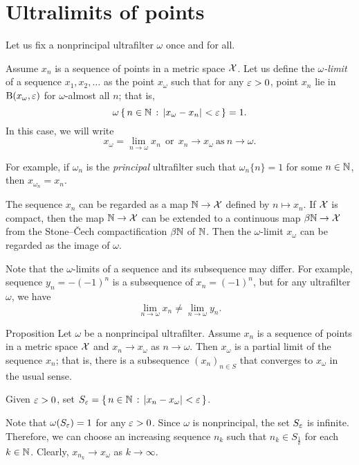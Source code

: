 \section{Ultralimits of points}
\label{ultralimits}

Let us fix a nonprincipal  ultrafilter $\omega$ once and for all.

Assume $x_n$ is a sequence of points in a metric space $\mathcal{X}$. 
Let us define the \emph{$\omega$-limit} of a sequence $x_1,x_2,\dots$ as the point $x_\omega$ 
such that for any $\varepsilon>0$, point $x_n$ lie in $\mathrm{B}{}(x_\omega,\varepsilon)$ for $\omega$-almost all $n$; 
that is,
\[\omega\set{n\in\NN}{\dist{x_\omega}{x_n}{}<\eps}=1.\]
In this case, we will write 
\[x_\omega=\lim_{n\to\omega} x_n
\ \ \text{or}\ \ 
x_n\to x_\omega\ \text{as}\ n\to\omega.\]

For example, if $\omega_n$ is the \textit{principal} ultrafilter such that $\omega_n\{n\}=1$ for some $n\in\mathbb{N}$, then
$x_{\omega_n}=x_n$.

The sequence $x_n$ can be regarded as a map $\mathbb{N}\to\mathcal{X}$ defined by $n\mapsto x_n$.
If $\mathcal{X}$ is compact, then the map $\mathbb{N}\to\mathcal{X}$ can be extended to a continuous map $\beta\mathbb{N}\to\mathcal{X}$ from the Stone--\v{C}ech compactification $\beta\mathbb{N}$ of $\mathbb{N}$.
Then the $\omega$-limit $x_\omega$ can be regarded as the image of $\omega$.

Note that the $\omega$-limits of a sequence and its subsequence may differ.
For example, sequence $y_n=-(-1)^n$ is a subsequence of $x_n=(-1)^n$, but for any ultrafilter $\omega$, we have
\[\lim_{n\to\omega}x_n
\ne
\lim_{n\to\omega}y_n.\] 

\begin{thm}{Proposition}\label{prop:ultra/partial}
Let $\omega$ be a nonprincipal ultrafilter.
Assume $x_n$ is a sequence of points in a metric space $\mathcal{X}$
and $x_n\to  x_\omega$ as $n\to\omega$.
Then $x_\omega$ is a partial limit of the sequence $x_n$;
that is, there is a subsequence $(x_n)_{n\in S}$ that converges to $x_\omega$ in the usual sense.
\end{thm}

Given $\varepsilon>0$, 
set $S_\eps=\set{n\in\NN}{\dist{x_n}{x_\omega}{}<\eps}$.

Note that $\omega(S_\varepsilon)=1$ for any $\varepsilon>0$.
Since $\omega$ is nonprincipal, the set $S_\varepsilon$ is infinite.
Therefore, we can choose an increasing sequence $n_k$
such that $n_k\in S_{\frac1k}$ for each $k\in \mathbb{N}$.
Clearly, $x_{n_k}\to x_\omega$ as $k\to\infty$.
\qeds

